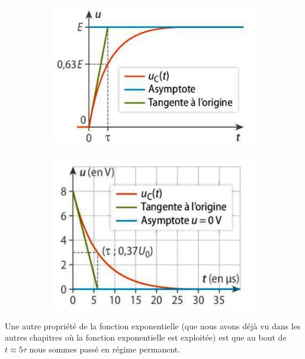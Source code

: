 \documentclass[11pt,a4paper]{article}
\begin{document}
\begin{figure}[H]
\centering
\begin{subfigure}{.49\textwidth}
  \centering
  \includegraphics[width=.95\linewidth]{imgs/p7/courbeRC.jpg}  
\end{subfigure}
\begin{subfigure}{.43\textwidth}
  \centering
  \includegraphics[width=.95\linewidth]{imgs/p7/courbeDecharge2.jpg}  
\end{subfigure}
\end{figure}

\begin{rmrq}
Une autre propriété de la fonction exponentielle (que nous avons déjà vu dans les autres chapitres où la fonction exponentielle est exploitée) est que au bout de $t\approx5\tau$ nous sommes passé en régime permanent. 
\end{rmrq}
\end{document}
